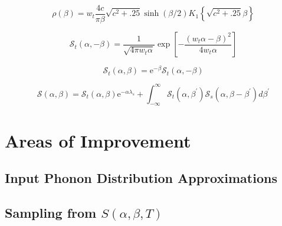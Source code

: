 \documentclass[../master.tex]{subfiles}
\begin{document}
                            
                            \begin{equation}
                              \rho(\beta)=w_{t}\frac{4c}{\pi\beta}\sqrt{c^{2}+.25}\sinh(\beta/2)K_{1}\left\{\sqrt{c^{2}+.25}\beta\right\}
                            \end{equation}


                            \begin{equation}
                              \mathcal{S}_{t}(\alpha,-\beta)=\frac{1}{\sqrt{4\pi w_{t}\alpha}}\exp\left[-\frac{\left(w_{t}\alpha-\beta\right)^{2}}{4w_{t}\alpha}\right]
                            \end{equation}

                            \begin{equation}
                              \mathcal{S}_{t}(\alpha,\beta)=\mathrm{e}^{-\beta}\mathcal{S}_{t}(\alpha,-\beta)
                            \end{equation}


                            \begin{equation}
                              \mathcal{S}(\alpha,\beta)=\mathcal{S}_{t}(\alpha,\beta)\mathrm{e}^{-\alpha\lambda_{s}}+\int_{-\infty}^{\infty}\mathcal{S}_{t}\left(\alpha,\beta^{\prime}\right)\mathcal{S}_{s}\left(\alpha,\beta-\beta^{\prime}\right)d\beta^{\prime}
                            \end{equation}






	\section{Areas of Improvement}
		\subsection{Input Phonon Distribution Approximations}

		\subsection{Sampling from $S(\alpha,\beta,T)$}
\end{document}
